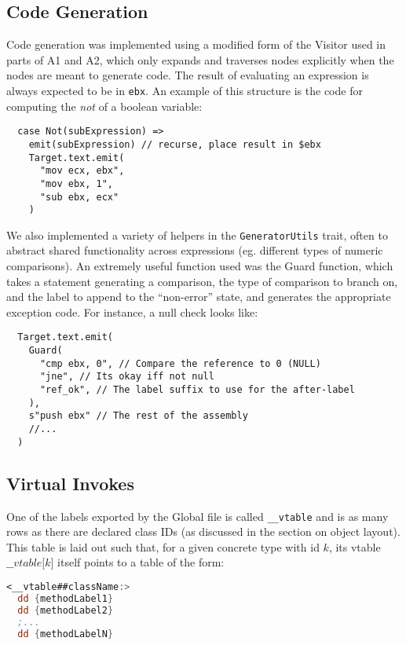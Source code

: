 \documentclass{article}
\begin{document}
\subsection{Code Generation}
Code generation was implemented using a modified form of the Visitor used in parts of A1 and A2, which only expands and
traverses nodes explicitly when the nodes are meant to generate code. The result of evaluating an expression is always
expected to be in \texttt{ebx}. An example of this structure is the code for computing the \emph{not} of a boolean
variable:

\begin{lstlisting}
  case Not(subExpression) =>
    emit(subExpression) // recurse, place result in $ebx
    Target.text.emit(
      "mov ecx, ebx",
      "mov ebx, 1",
      "sub ebx, ecx"
    )
\end{lstlisting}

We also implemented a variety of helpers in the \texttt{GeneratorUtils} trait, often to abstract shared functionality
across expressions (eg. different types of numeric comparisons). An extremely useful function used was the Guard
function, which takes a statement generating a comparison, the type of comparison to branch on, and the label to append
to the ``non-error'' state, and generates the appropriate exception code. For instance, a null check looks like:

\begin{lstlisting}
  Target.text.emit(
    Guard(
      "cmp ebx, 0", // Compare the reference to 0 (NULL)
      "jne", // Its okay iff not null
      "ref_ok", // The label suffix to use for the after-label
    ),
    s"push ebx" // The rest of the assembly
    //...
  )
\end{lstlisting}



\subsection{Virtual Invokes}
One of the labels exported by the Global file is called \texttt{\_\_vtable} and is as many rows as there are declared
class IDs (as discussed in the section on object layout). This table is laid out such that, for a given concrete type
with id $k$, its vtable $\_\_vtable\lbrack k \rbrack$ itself points to a table of the form:

\begin{lstlisting}[language=nasm]
<__vtable##className:>
  dd {methodLabel1}
  dd {methodLabel2}
  ;...
  dd {methodLabelN}
\end{lstlisting}
\end{document}
